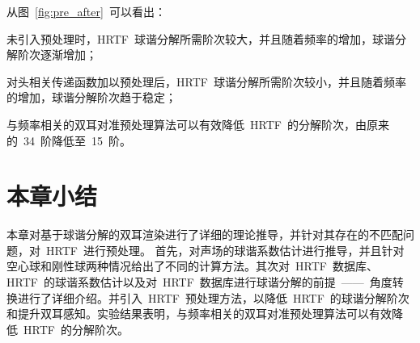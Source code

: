 从图~\ref{fig:pre_after}~可以看出：
\begin{inparaenum}[（1）]

\item 未引入预处理时，HRTF~球谐分解所需阶次较大，并且随着频率的增加，球谐分解阶次逐渐增加；

\item 对头相关传递函数加以预处理后，HRTF~球谐分解所需阶次较小，并且随着频率的增加，球谐分解阶次趋于稳定；

\item 与频率相关的双耳对准预处理算法可以有效降低~HRTF~的分解阶次，由原来的~34~阶降低至~15~阶。

\end{inparaenum}

\section{本章小结}

本章对基于球谐分解的双耳渲染进行了详细的理论推导，并针对其存在的不匹配问题，对~HRTF~进行预处理。 首先，对声场的球谐系数估计进行推导，并且针对空心球和刚性球两种情况给出了不同的计算方法。其次对~HRTF~数据库、HRTF~的球谐系数估计以及对~HRTF~数据库进行球谐分解的前提~——~角度转换进行了详细介绍。并引入~HRTF~预处理方法，以降低~HRTF~的球谐分解阶次和提升双耳感知。实验结果表明，与频率相关的双耳对准预处理算法可以有效降低~HRTF~的分解阶次。

